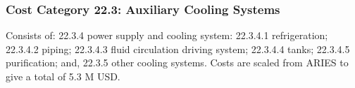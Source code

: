 \subsubsection{Cost Category 22.3: Auxiliary Cooling Systems}

Consists of: 22.3.4 power supply and cooling system: 22.3.4.1 refrigeration; 22.3.4.2 piping; 22.3.4.3 fluid circulation driving system; 22.3.4.4 tanks; 22.3.4.5 purification; and, 22.3.5 other cooling systems. Costs are scaled from ARIES to give a total of 5.3 M USD.